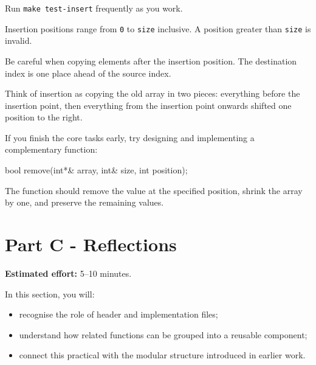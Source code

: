 \documentclass{csc2059practical}
\begin{document}
Run \texttt{make test-insert} frequently as you work.

\begin{commonerror}
Insertion positions range from \texttt{0} to \texttt{size} inclusive. A position greater than \texttt{size} is invalid.
\end{commonerror}

\begin{commonerror}
Be careful when copying elements after the insertion position. The destination index is one place ahead of the source index.
\end{commonerror}

\begin{tipbox}
Think of insertion as copying the old array in two pieces: everything before the insertion point, then everything from the insertion point onwards shifted one position to the right.
\end{tipbox}

\begin{challengebox}
If you finish the core tasks early, try designing and implementing a complementary function:

\begin{cppcode}
bool remove(int*& array,
            int& size,
            int position);
\end{cppcode}

The function should remove the value at the specified position, shrink the array by one, and preserve the remaining values.
\end{challengebox}

\Needspace{90mm}
\section{Part C - Reflections}


\begin{infobox}
\textbf{Estimated effort:} 5--10 minutes.
\end{infobox}

\begin{learningoutcomes}
In this section, you will:
\begin{itemize}
  \item recognise the role of header and implementation files;
  \item understand how related functions can be grouped into a reusable component;
  \item connect this practical with the modular structure introduced in earlier work.
\end{itemize}
\end{learningoutcomes}
\end{document}
